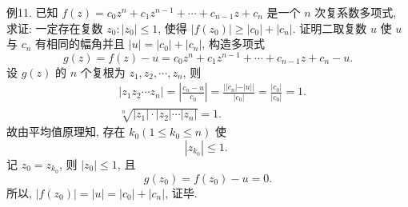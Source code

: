例11. 已知 $f(z)=c_0 z^n+c_1 z^{n-1}+\cdots+c_{n-1} z+c_n$ 是一个 $n$ 次复系数多项式, 求证: 一定存在复数 $z_0:\left|z_0\right| \leqslant 1$, 使得 $\left|f\left(z_0\right)\right| \geqslant\left|c_0\right|+\left|c_n\right|$. 
证明二取复数 $u$ 使 $u$ 与 $c_n$ 有相同的幅角并且 $|u|=\left|c_0\right|+\left|c_n\right|$, 构造多项式
$$
g(z)=f(z)-u=c_0 z^n+c_1 z^{n-1}+\cdots+c_{n-1} z+c_n-u .
$$
设 $g(z)$ 的 $n$ 个复根为 $z_1, z_2, \cdots, z_n$, 则
$$
\begin{aligned}
& \left|z_1 z_2 \cdots z_n\right|=\left|\frac{c_n-u}{c_0}\right|=\frac{|| c_n|-| u||}{\left|c_0\right|}=\frac{\left|c_0\right|}{\left|c_0\right|}=1 . \\
& \sqrt[n]{\left|z_1\right| \cdot\left|z_2\right| \cdots\left|z_n\right|}=1 .
\end{aligned}
$$
故由平均值原理知, 存在 $k_0\left(1 \leqslant k_0 \leqslant n\right)$ 使
$$
\left|z_{k_0}\right| \leqslant 1 \text {. }
$$
记 $z_0=z_{k_0}$, 则 $\left|z_0\right| \leqslant 1$, 且
$$
g\left(z_0\right)=f\left(z_0\right)-u=0 .
$$
所以, $\left|f\left(z_0\right)\right|=|u|=\left|c_0\right|+\left|c_n\right|$, 证毕.


